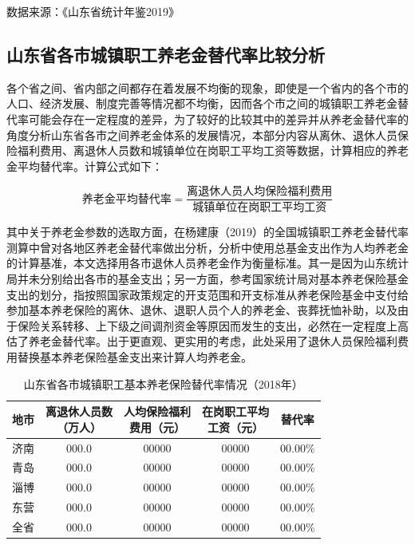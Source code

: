 \documentclass[a4paper,12pt]{ctexart}
\newcommand{\wuhao}{\fontsize{10.5pt}{15.75pt}\selectfont}
\numberwithin{equation}{section}
\begin{document}
\begin{spacing}{1.5}
\begin{table}[htbp]
\vspace{0.2cm}
{\wuhao 数据来源：《山东省统计年鉴2019》}
\end{table}

\subsection{山东省各市城镇职工养老金替代率比较分析}

各个省之间、省内部之间都存在着发展不均衡的现象，即使是一个省内的各个市的人口、经济发展、制度完善等情况都不均衡，因而各个市之间的城镇职工养老金替代率可能会存在一定程度的差异，为了较好的比较其中的差异并从养老金替代率的角度分析山东省各市之间养老金体系的发展情况，本部分内容从离休、退休人员保险福利费用、离退休人员数和城镇单位在岗职工平均工资等数据，计算相应的养老金平均替代率。计算公式如下：

\begin{equation}
\text{养老金平均替代率} = \frac{\text{离退休人员人均保险福利费用}}{\text{城镇单位在岗职工平均工资}}
\end{equation}

其中关于养老金参数的选取方面，在杨建康（2019）的全国城镇职工养老金替代率测算中曾对各地区养老金替代率做出分析，分析中使用总基金支出作为人均养老金的计算基准，本文选择用各市退休人员养老金作为衡量标准。其一是因为山东统计局并未分别给出各市的基金支出；另一方面，参考国家统计局对基本养老保险基金支出的划分，指按照国家政策规定的开支范围和开支标准从养老保险基金中支付给参加基本养老保险的离休、退休、退职人员个人的养老金、丧葬抚恤补助，以及由于保险关系转移、上下级之间调剂资金等原因而发生的支出，必然在一定程度上高估了养老金替代率。出于更直观、更实用的考虑，此处采用了退休人员保险福利费用替换基本养老保险基金支出来计算人均养老金。

\vspace{0.3cm}
\begin{table}[htbp]
\centering
\caption{山东省各市城镇职工基本养老保险替代率情况（2018年）}
\wuhao
\begin{tabular}{ccccc}
\toprule
地市 & \makecell{离退休人员数\\（万人）} & \makecell{人均保险福利\\费用（元）} & \makecell{在岗职工平均\\工资（元）} & 替代率 \\
\midrule
济南 & 000.0 & 00000 & 00000 & 00.00\% \\
青岛 & 000.0 & 00000 & 00000 & 00.00\% \\
淄博 & 000.0 & 00000 & 00000 & 00.00\% \\
东营 & 000.0 & 00000 & 00000 & 00.00\% \\
全省 & 000.0 & 00000 & 00000 & 00.00\% \\
\bottomrule
\end{tabular}


\end{table}
\end{spacing}
\end{document}
